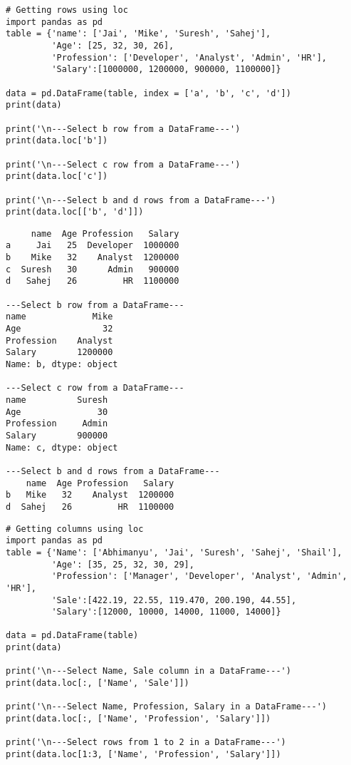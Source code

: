 \documentclass[11pt]{article}
\begin{document}
\begin{verbatim}
# Getting rows using loc
import pandas as pd
table = {'name': ['Jai', 'Mike', 'Suresh', 'Sahej'],
         'Age': [25, 32, 30, 26],
         'Profession': ['Developer', 'Analyst', 'Admin', 'HR'],
         'Salary':[1000000, 1200000, 900000, 1100000]}

data = pd.DataFrame(table, index = ['a', 'b', 'c', 'd'])
print(data)

print('\n---Select b row from a DataFrame---')
print(data.loc['b'])

print('\n---Select c row from a DataFrame---')
print(data.loc['c'])

print('\n---Select b and d rows from a DataFrame---')
print(data.loc[['b', 'd']])
\end{verbatim}

\begin{verbatim}
     name  Age Profession   Salary
a     Jai   25  Developer  1000000
b    Mike   32    Analyst  1200000
c  Suresh   30      Admin   900000
d   Sahej   26         HR  1100000

---Select b row from a DataFrame---
name             Mike
Age                32
Profession    Analyst
Salary        1200000
Name: b, dtype: object

---Select c row from a DataFrame---
name          Suresh
Age               30
Profession     Admin
Salary        900000
Name: c, dtype: object

---Select b and d rows from a DataFrame---
    name  Age Profession   Salary
b   Mike   32    Analyst  1200000
d  Sahej   26         HR  1100000
\end{verbatim}

\begin{verbatim}
# Getting columns using loc
import pandas as pd
table = {'Name': ['Abhimanyu', 'Jai', 'Suresh', 'Sahej', 'Shail'],
         'Age': [35, 25, 32, 30, 29],
         'Profession': ['Manager', 'Developer', 'Analyst', 'Admin', 'HR'],
         'Sale':[422.19, 22.55, 119.470, 200.190, 44.55],
         'Salary':[12000, 10000, 14000, 11000, 14000]}

data = pd.DataFrame(table)
print(data)

print('\n---Select Name, Sale column in a DataFrame---')
print(data.loc[:, ['Name', 'Sale']])

print('\n---Select Name, Profession, Salary in a DataFrame---')
print(data.loc[:, ['Name', 'Profession', 'Salary']])

print('\n---Select rows from 1 to 2 in a DataFrame---')
print(data.loc[1:3, ['Name', 'Profession', 'Salary']])
\end{verbatim}
\end{document}
